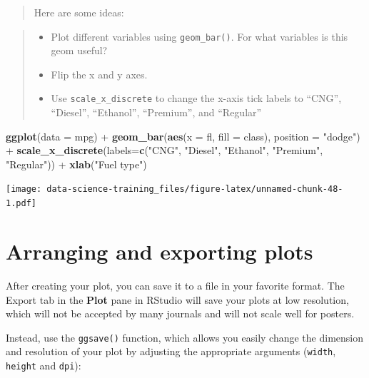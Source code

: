 \documentclass[]{book}
\newenvironment{Shaded}{\begin{snugshade}}{\end{snugshade}}
\newcommand{\KeywordTok}[1]{\textcolor[rgb]{0.13,0.29,0.53}{\textbf{{#1}}}}
\newcommand{\DataTypeTok}[1]{\textcolor[rgb]{0.13,0.29,0.53}{{#1}}}
\newcommand{\StringTok}[1]{\textcolor[rgb]{0.31,0.60,0.02}{{#1}}}
\newcommand{\NormalTok}[1]{{#1}}
\providecommand{\tightlist}{%
  \setlength{\itemsep}{0pt}\setlength{\parskip}{0pt}}
\theoremstyle{definition}
\theoremstyle{definition}
\theoremstyle{definition}
\theoremstyle{remark}
\begin{document}
\begin{quote}
Here are some ideas:
\end{quote}

\begin{quote}
\begin{itemize}
\tightlist
\item
  Plot different variables using \texttt{geom\_bar()}. For what
  variables is this geom useful?
\item
  Flip the x and y axes.
\item
  Use \texttt{scale\_x\_discrete} to change the x-axis tick labels to
  ``CNG'', ``Diesel'', ``Ethanol'', ``Premium'', and ``Regular''
\end{itemize}
\end{quote}

\begin{Shaded}
\begin{Highlighting}[]
\KeywordTok{ggplot}\NormalTok{(}\DataTypeTok{data =} \NormalTok{mpg) +}\StringTok{ }
\StringTok{      }\KeywordTok{geom_bar}\NormalTok{(}\KeywordTok{aes}\NormalTok{(}\DataTypeTok{x =} \NormalTok{fl, }\DataTypeTok{fill =} \NormalTok{class), }\DataTypeTok{position =} \StringTok{"dodge"}\NormalTok{) +}
\StringTok{   }\KeywordTok{scale_x_discrete}\NormalTok{(}\DataTypeTok{labels=}\KeywordTok{c}\NormalTok{(}\StringTok{"CNG"}\NormalTok{, }\StringTok{"Diesel"}\NormalTok{, }\StringTok{"Ethanol"}\NormalTok{, }\StringTok{"Premium"}\NormalTok{, }\StringTok{"Regular"}\NormalTok{)) +}
\StringTok{  }\KeywordTok{xlab}\NormalTok{(}\StringTok{"Fuel type"}\NormalTok{)}
\end{Highlighting}
\end{Shaded}

\texttt{[image: data-science-training\_files/figure-latex/unnamed-chunk-48-1.pdf]}

\section{Arranging and exporting
plots}\label{arranging-and-exporting-plots}

After creating your plot, you can save it to a file in your favorite
format. The Export tab in the \textbf{Plot} pane in RStudio will save
your plots at low resolution, which will not be accepted by many
journals and will not scale well for posters.

Instead, use the \texttt{ggsave()} function, which allows you easily
change the dimension and resolution of your plot by adjusting the
appropriate arguments (\texttt{width}, \texttt{height} and
\texttt{dpi}):
\end{document}
